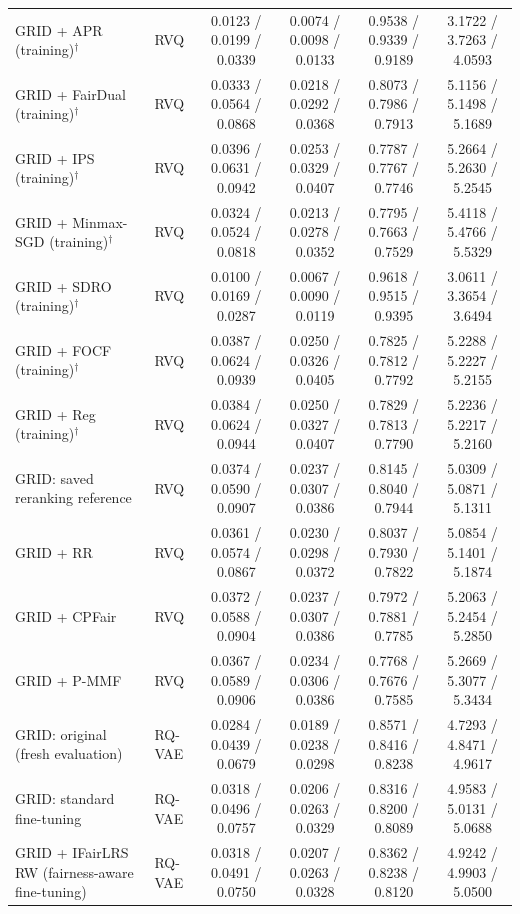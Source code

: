 \begin{table}[p]
{\begin{tabular}{llcccc}
GRID + APR (training)$^{\dagger}$ & RVQ & 0.0123 / 0.0199 / 0.0339 & 0.0074 / 0.0098 / 0.0133 & 0.9538 / 0.9339 / 0.9189 & 3.1722 / 3.7263 / 4.0593 \\
GRID + FairDual (training)$^{\dagger}$ & RVQ & 0.0333 / 0.0564 / 0.0868 & 0.0218 / 0.0292 / 0.0368 & 0.8073 / 0.7986 / 0.7913 & 5.1156 / 5.1498 / 5.1689 \\
GRID + IPS (training)$^{\dagger}$ & RVQ & 0.0396 / 0.0631 / 0.0942 & 0.0253 / 0.0329 / 0.0407 & 0.7787 / 0.7767 / 0.7746 & 5.2664 / 5.2630 / 5.2545 \\
GRID + Minmax-SGD (training)$^{\dagger}$ & RVQ & 0.0324 / 0.0524 / 0.0818 & 0.0213 / 0.0278 / 0.0352 & 0.7795 / 0.7663 / 0.7529 & 5.4118 / 5.4766 / 5.5329 \\
GRID + SDRO (training)$^{\dagger}$ & RVQ & 0.0100 / 0.0169 / 0.0287 & 0.0067 / 0.0090 / 0.0119 & 0.9618 / 0.9515 / 0.9395 & 3.0611 / 3.3654 / 3.6494 \\
GRID + FOCF (training)$^{\dagger}$ & RVQ & 0.0387 / 0.0624 / 0.0939 & 0.0250 / 0.0326 / 0.0405 & 0.7825 / 0.7812 / 0.7792 & 5.2288 / 5.2227 / 5.2155 \\
GRID + Reg (training)$^{\dagger}$ & RVQ & 0.0384 / 0.0624 / 0.0944 & 0.0250 / 0.0327 / 0.0407 & 0.7829 / 0.7813 / 0.7790 & 5.2236 / 5.2217 / 5.2160 \\
GRID: saved reranking reference & RVQ & 0.0374 / 0.0590 / 0.0907 & 0.0237 / 0.0307 / 0.0386 & 0.8145 / 0.8040 / 0.7944 & 5.0309 / 5.0871 / 5.1311 \\
GRID + RR & RVQ & 0.0361 / 0.0574 / 0.0867 & 0.0230 / 0.0298 / 0.0372 & 0.8037 / 0.7930 / 0.7822 & 5.0854 / 5.1401 / 5.1874 \\
GRID + CPFair & RVQ & 0.0372 / 0.0588 / 0.0904 & 0.0237 / 0.0307 / 0.0386 & 0.7972 / 0.7881 / 0.7785 & 5.2063 / 5.2454 / 5.2850 \\
GRID + P-MMF & RVQ & 0.0367 / 0.0589 / 0.0906 & 0.0234 / 0.0306 / 0.0386 & 0.7768 / 0.7676 / 0.7585 & 5.2669 / 5.3077 / 5.3434 \\
\midrule
GRID: original (fresh evaluation) & RQ-VAE & 0.0284 / 0.0439 / 0.0679 & 0.0189 / 0.0238 / 0.0298 & 0.8571 / 0.8416 / 0.8238 & 4.7293 / 4.8471 / 4.9617 \\
GRID: standard fine-tuning & RQ-VAE & 0.0318 / 0.0496 / 0.0757 & 0.0206 / 0.0263 / 0.0329 & 0.8316 / 0.8200 / 0.8089 & 4.9583 / 5.0131 / 5.0688 \\
GRID + IFairLRS RW (fairness-aware fine-tuning) & RQ-VAE & 0.0318 / 0.0491 / 0.0750 & 0.0207 / 0.0263 / 0.0328 & 0.8362 / 0.8238 / 0.8120 & 4.9242 / 4.9903 / 5.0500 \\

\end{tabular}}
\end{table}
